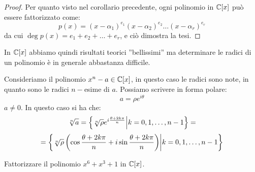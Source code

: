 \documentclass[11pt]{scrartcl}
\begin{document}
\begin{proof}
Per quanto visto nel corollario precedente, ogni polinomio in $\mathbb C[x]$ può essere fattorizzato come:
	\[ p(x) = (x - \alpha_1)^{e_1}(x - \alpha_2)^{e_2}\ldots (x - \alpha_r)^{e_r}
	\]
da cui $\deg p(x) = e_1 + e_2 + \ldots + e_r$, e ciò dimostra la tesi.
\end{proof}

\begin{remark}
In $\mathbb C[x]$ abbiamo quindi risultati teorici ''bellissimi'' ma determinare le radici di un polinomio è in generale abbastanza difficile.
\end{remark}

\begin{example}
Consideriamo il polinomio $x^n-a \in \mathbb C[x]$, in questo caso le radici sono note, in quanto sono le radici $n-$esime di $a$. Possiamo scrivere in forma polare:
	\[ a = \rho e^{i\theta}
	\]
$a \ne 0$. In questo caso si ha che:
	\[ \sqrt[n]{a} = \left\{\sqrt[n]{\rho}e^{i \frac{\theta +2k\pi}{n}} \middle| k = 0,1,\ldots,n-1\right\} =\]\[= \left\{\sqrt[n]{\rho}\left(\cos{\frac{\theta +2k\pi}{n} + i\sin{\frac{\theta +2k\pi}{n}}}\right) \middle| k = 0,1,\ldots,n-1\right\}
	\]
\end{example}

\begin{exercise}
Fattorizzare il polinomio $x^6+x^3+1$ in $\mathbb C[x]$.
\end{exercise}
\end{document}
